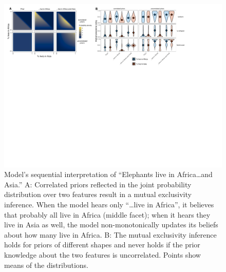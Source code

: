 \documentclass[10pt,letterpaper]{article}
\begin{document}
\begin{figure}[t]
  \centering
    \includegraphics[width=1\textwidth]{model}
    \vspace{-0.5cm}
  \caption{Model's sequential interpretation of ``Elephants live in Africa\ldots and Asia.'' A: Correlated priors reflected in the joint probability distribution over two features result in a mutual exclusivity inference. When the model hears only ``\ldots live in Africa'', it believes that probably all live in Africa (middle facet); when it hears they live in Asia as well, the model non-monotonically updates its beliefs about how many live in Africa. B: The mutual exclusivity inference holds for priors of different shapes and never holds if the prior knowledge about the two features is uncorrelated. Points show means of the distributions.}
  \label{fig:model}
          \vspace{-0.5cm}
\end{figure}
\end{document}
